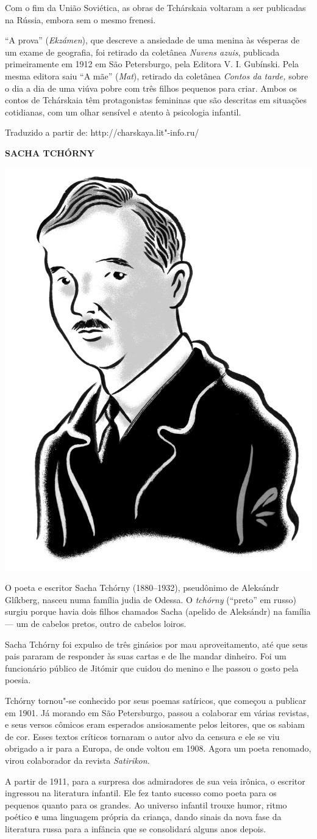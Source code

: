 Com o fim da União Soviética, as obras de Tchárskaia voltaram a ser
publicadas na Rússia, embora sem o mesmo frenesi.

``A prova'' (\emph{Ekzámen}), que descreve a ansiedade de uma
menina às vésperas de um exame de geografia, foi retirado da coletânea
\emph{Nuvens azuis}, publicada primeiramente em 1912 em São Petersburgo,
pela Editora V. I. Gubínski. Pela mesma editora saiu ``A mãe''
(\emph{Mat}), retirado da coletânea \emph{Contos da tarde,} sobre o dia
a dia de uma viúva pobre com três filhos pequenos para criar. Ambos os
contos de Tchárskaia têm protagonistas femininas que são descritas em situações
cotidianas, com um olhar sensível e atento à psicologia infantil.

Traduzido a partir de: http://charskaya.lit"-info.ru/

\bigskip
\noindent\textbf{SACHA TCHÓRNY}\medskip

\noindent\includegraphics[width=.8in]{./imgs/autor11.jpg}

\noindent{}O poeta e escritor Sacha Tchórny (1880--1932), pseudônimo de Aleksándr
Glíkberg, nasceu numa família judia de Odessa. O \emph{tchórny}
(``preto'' em russo) surgiu porque havia dois filhos chamados Sacha
(apelido de Aleksándr) na família --- um de cabelos pretos, outro de
cabelos loiros.

Sacha Tchórny foi expulso de três ginásios por mau aproveitamento, até
que seus pais pararam de responder às suas cartas e de lhe mandar
dinheiro. Foi um funcionário público de Jitómir que cuidou do menino e
lhe passou o gosto pela poesia.

Tchórny tornou"-se conhecido por seus poemas satíricos, que começou a
publicar em 1901. Já morando em São Petersburgo, passou a colaborar em
várias revistas, e seus versos cômicos eram esperados ansiosamente pelos
leitores, que os sabiam de cor. Esses textos críticos tornaram o autor
alvo da censura e ele se viu obrigado a ir para a Europa, de onde voltou
em 1908. Agora um poeta renomado, virou colaborador da revista
\emph{Satirikon.}

A partir de 1911, para a surpresa dos admiradores de sua veia irônica, o
escritor ingressou na literatura infantil. Ele fez tanto sucesso como
poeta para os pequenos quanto para os grandes. Ao universo infantil
trouxe humor, ritmo poético е uma linguagem própria da criança, dando
sinais da nova fase da literatura russa para a infância que se
consolidará alguns anos depois.

